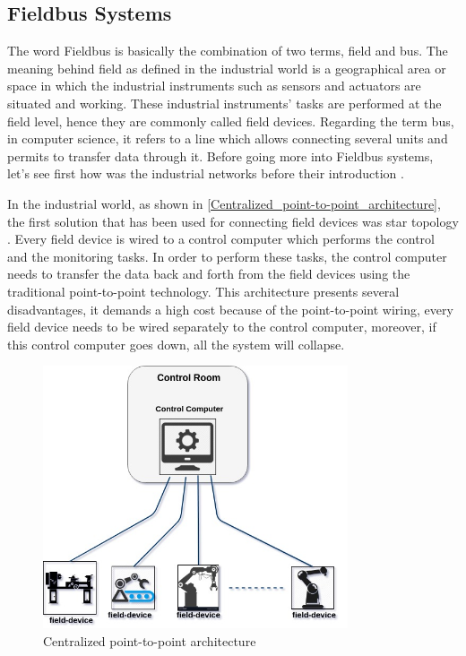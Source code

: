 \subsection{Fieldbus Systems}

The word Fieldbus is basically the combination of two terms, field and bus.
The meaning behind field as defined in the industrial world is a geographical
area or space in which the industrial instruments such as sensors and actuators
are situated and working. These industrial instruments' tasks are performed at the
field level, hence they are commonly called field devices.
Regarding the term bus, in computer science, it refers to a line
which allows connecting several units and permits to transfer
data through it. Before going more into Fieldbus systems, let's
see first how was the industrial networks before their introduction \cite{zurawski2014industrial}.

In the industrial world, as shown in \autoref{Centralized_point-to-point_architecture}, the first solution
that has been used for connecting field devices
was star topology \cite{zurawski2014industrial}. Every field device is wired
to a control computer which performs the control and the monitoring tasks. In order to perform these tasks, the
control computer needs to transfer the data back and forth from the field devices using the traditional
point-to-point technology. This architecture presents several
disadvantages, it demands a high cost because of the point-to-point wiring, every field device needs to be wired
separately to the control computer, moreover, if this control computer goes down, all the system will collapse.

\begin{figure}[!htbp]
\centering
\includegraphics[width=9cm]{figures/fieldbus/star_topology_used_up_to_1960.jpg}
\caption{Centralized point-to-point architecture}\label{Centralized_point-to-point_architecture}
\end{figure}

